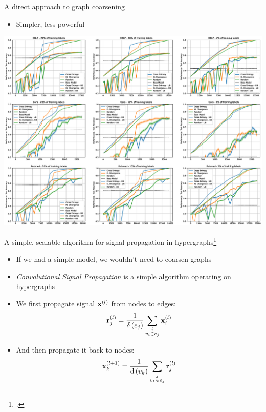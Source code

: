 \documentclass[10pt]{beamer}
\newcommand{\mathvec}{\ensuremath{\mathbf}}
\newcommand{\vdeg}{\mathrm{d}} %
\newcommand{\edeg}{\delta} %
\begin{document}
\begin{frame}{A direct approach to graph coarsening}
	\begin{itemize}
		\item Simpler, less powerful
	\end{itemize}

	\vspace{-25pt}

	\centering
	\includegraphics[width=\linewidth]{images/direct-graph-coarsening-results.eps}
\end{frame}

\begin{frame}{A simple, scalable algorithm for signal propagation in hypergraphs\footcite{prochazka_convolutional_2024}}
	\begin{itemize}
		\item<1-> If we had a simple model, we wouldn't need to coarsen graphs
		\item<2-> \textit{Convolutional Signal Propagation} is a simple algorithm operating on hypergraphs
		\item<3-> We first propagate signal \( \mathvec{x}^{(l)} \) from nodes to edges:
			\[
				\mathvec{r}_j^{(l)}=\frac{1}{\edeg \left( e_j \right)}\sum_{\substack{i \\ v_i\in e_j}} \mathvec{x}_i^{(l)}
			\]
		\item<4-> And then propagate it back to nodes:
			\[
				\mathvec{x}_k^{(l+1)}=\frac{1}{\vdeg \left( v_k \right)}\sum_{\substack{j \\ v_k \in e_j}} \mathvec{r}_j^{(l)}
			\]
	\end{itemize}
\end{frame}
\end{document}
